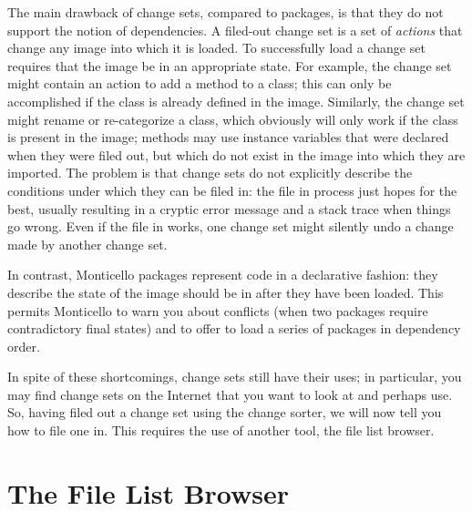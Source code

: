 \documentclass[a4paper,10pt,twoside]{book}
\begin{document}
The main drawback of change sets, compared to  packages, is that they do not support the notion of dependencies.
A filed-out change set is a set of \emph{actions} that change any image into which it is loaded. To successfully load a change set requires that the image be in an appropriate state.
For example, the change set might contain an action to add a method to a class; this can only be accomplished if the class is already defined in the image.
Similarly, the change set might rename or re-categorize a class, which obviously will only work if the class is present in the image; methods may use instance variables that were declared when they were filed out, but which do not exist in the image into which they are imported.
The problem is that change sets do not explicitly describe the conditions under which they can be filed in:
the file in process just hopes for the best, usually resulting in a cryptic error message and a stack trace when things go wrong.
Even if the file in works, one change set might silently undo a change made by another change set.

In contrast, Monticello packages represent code in a declarative fashion: they describe the state of the image should be in after they have been loaded.
This permits Monticello to warn you about conflicts (when two packages require contradictory final states)
and to offer to load a series of packages in dependency order.

In spite of these shortcomings, change sets still have their uses; in particular, you may find change sets on the Internet that you want to look at and perhaps use.
So, having filed out a change set using the change sorter, we will now tell you how to file one in.
This requires the use of another tool, the file list browser.


\section{The File List Browser}
\end{document}
